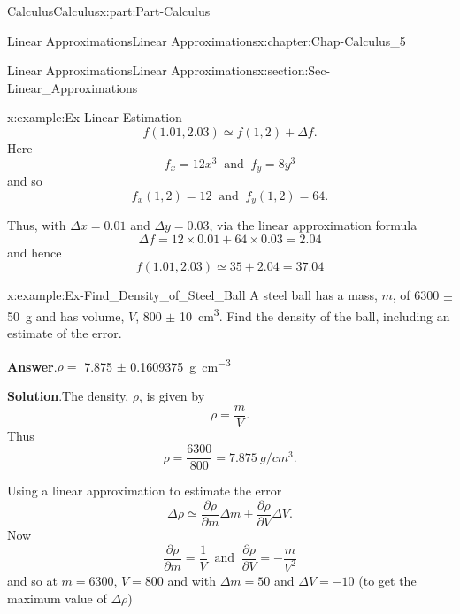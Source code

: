 \documentclass[oneside,10pt,]{book}
\newcommand{\blocktitlefont}{\relax}
\numberwithin{equation}{section}
\begin{document}
\begin{partptx}{Calculus}{}{Calculus}{}{}{x:part:Part-Calculus}
\begin{chapterptx}{Linear Approximations}{}{Linear Approximations}{}{}{x:chapter:Chap-Calculus_5}
\begin{sectionptx}{Linear Approximations}{}{Linear Approximations}{}{}{x:section:Sec-Linear_Approximations}
\begin{example}{}{x:example:Ex-Linear-Estimation}
\begin{equation*}
f(1.01,2.03) \simeq f(1,2) + \Delta f\text{.}
\end{equation*}
Here%
\begin{equation*}
f_x = 12x^3 \: \text{ and } \: f_y = 8y^3
\end{equation*}
and so%
\begin{equation*}
f_x(1,2) = 12 \: \text{ and } \: f_y(1,2) = 64\text{.}
\end{equation*}
%
\par
Thus, with \(\Delta x = 0.01\) and \(\Delta y = 0.03\), via the linear approximation formula%
\begin{equation*}
\Delta f = 12 \times 0.01 + 64 \times 0.03 = 2.04
\end{equation*}
and hence%
\begin{equation*}
f(1.01,2.03) \simeq 35 + 2.04 = 37.04
\end{equation*}
%
\end{example}
\begin{example}{}{x:example:Ex-Find_Density_of_Steel_Ball}%
A steel ball has a mass, \(m\), of 6300 \(\pm\) \SI{50}{\gram} and has volume, \(V\), 800 \(\pm\) \SI{10}{\centi\meter\tothe{3}}. Find the density of the ball, including an estimate of the error.%
\par\smallskip%
\noindent\textbf{\blocktitlefont Answer}.\hypertarget{g:answer:id548979}{}\quad{}\(\rho = \) 7.875 \(\pm \) \SI{0.1609375}{\gram\per\centi\meter\tothe{3}}%
\par\smallskip%
\noindent\textbf{\blocktitlefont Solution}.\hypertarget{g:solution:id549033}{}\quad{}The density, \(\rho\), is given by%
\begin{equation*}
\rho = \dfrac{m}{V}\text{.}
\end{equation*}
Thus%
\begin{equation*}
\rho = \dfrac{6300}{800} = 7.875 \: g/cm^3.
\end{equation*}
%
\par
Using a linear approximation to estimate the error%
\begin{equation*}
\Delta \rho \simeq \dfrac{\partial \rho}{\partial m} \Delta m + \dfrac{\partial \rho}{\partial V} \Delta V\text{.}
\end{equation*}
Now%
\begin{equation*}
\dfrac{\partial \rho}{\partial m} = \dfrac{1}{V} \: \text{ and } \: \dfrac{\partial \rho}{\partial V} = -\dfrac{m}{V^2}
\end{equation*}
and so at \(m=6300\), \(V=800\) and with \(\Delta m = 50\) and \(\Delta V = -10\) (to get the maximum value of \(\Delta \rho\))%

\end{example}
\end{sectionptx}
\end{chapterptx}
\end{partptx}
\end{document}
